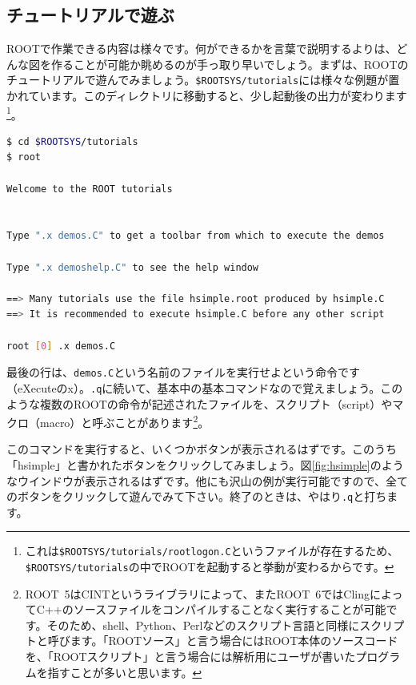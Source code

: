 \subsection{チュートリアルで遊ぶ}
\label{subsec:tutorial}
ROOTで作業できる内容は様々です。何ができるかを言葉で説明するよりは、どんな図を作ることが可能か眺めるのが手っ取り早いでしょう。まずは、ROOTのチュートリアルで遊んでみましょう。\texttt{\$ROOTSYS/tutorials}には様々な例題が置かれています。このディレクトリに移動すると、少し起動後の出力が変わります\footnote{これは\texttt{\$ROOTSYS/tutorials/rootlogon.C}というファイルが存在するため、\texttt{\$ROOTSYS/tutorials}の中でROOTを起動すると挙動が変わるからです。}。
\begin{lstlisting}[language=bash]
$ cd $ROOTSYS/tutorials
$ root

Welcome to the ROOT tutorials


Type ".x demos.C" to get a toolbar from which to execute the demos

Type ".x demoshelp.C" to see the help window

==> Many tutorials use the file hsimple.root produced by hsimple.C
==> It is recommended to execute hsimple.C before any other script

root [0] .x demos.C
\end{lstlisting}
最後の行は、\texttt{demos.C}という名前のファイルを実行せよという命令です（eXecuteのx）。\texttt{.q}に続いて、基本中の基本コマンドなので覚えましょう。このような複数のROOTの命令が記述されたファイルを、スクリプト（script）やマクロ（macro）と呼ぶことがあります\footnote{ROOT~5はCINTというライブラリによって、またROOT~6ではClingによってC++のソースファイルをコンパイルすることなく実行することが可能です。そのため、shell、Python、Perlなどのスクリプト言語と同様にスクリプトと呼びます。「ROOTソース」と言う場合にはROOT本体のソースコードを、「ROOTスクリプト」と言う場合には解析用にユーザが書いたプログラムを指すことが多いと思います。}。

このコマンドを実行すると、いくつかボタンが表示されるはずです。このうち「hsimple」と書かれたボタンをクリックしてみましょう。図\ref{fig:hsimple}のようなウインドウが表示されるはずです。他にも沢山の例が実行可能ですので、全てのボタンをクリックして遊んでみて下さい。終了のときは、やはり\texttt{.q}と打ちます。

